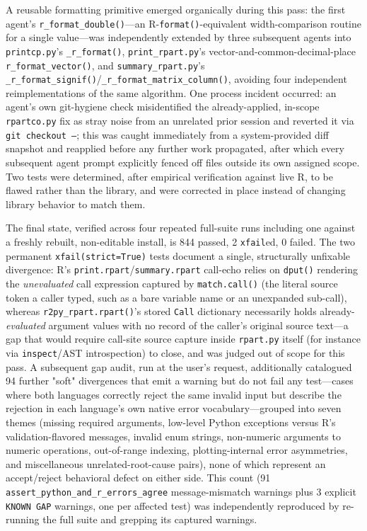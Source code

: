 \documentclass[12pt]{article}
\begin{document}
A reusable formatting primitive emerged organically during this pass: the first agent's \texttt{r\_format\_double()}---an R-\texttt{format()}-equivalent width-comparison routine for a single value---was independently extended by three subsequent agents into \texttt{printcp.py}'s \texttt{\_r\_format()}, \texttt{print\_rpart.py}'s vector-and-common-decimal-place \texttt{r\_format\_vector()}, and \texttt{summary\_rpart.py}'s \texttt{\_r\_format\_signif()}/\texttt{\_r\_format\_matrix\_column()}, avoiding four independent reimplementations of the same algorithm. One process incident occurred: an agent's own git-hygiene check misidentified the already-applied, in-scope \texttt{rpartco.py} fix as stray noise from an unrelated prior session and reverted it via \texttt{git checkout --}; this was caught immediately from a system-provided diff snapshot and reapplied before any further work propagated, after which every subsequent agent prompt explicitly fenced off files outside its own assigned scope. Two tests were determined, after empirical verification against live R, to be flawed rather than the library, and were corrected in place instead of changing library behavior to match them.

The final state, verified across four repeated full-suite runs including one against a freshly rebuilt, non-editable install, is 844 passed, 2 \texttt{xfail}ed, 0 failed. The two permanent \texttt{xfail(strict=True)} tests document a single, structurally unfixable divergence: R's \texttt{print.rpart}/\texttt{summary.rpart} call-echo relies on \texttt{dput()} rendering the \emph{unevaluated} call expression captured by \texttt{match.call()} (the literal source token a caller typed, such as a bare variable name or an unexpanded sub-call), whereas \texttt{r2py\_rpart.rpart()}'s stored \texttt{Call} dictionary necessarily holds already-\emph{evaluated} argument values with no record of the caller's original source text---a gap that would require call-site source capture inside \texttt{rpart.py} itself (for instance via \texttt{inspect}/AST introspection) to close, and was judged out of scope for this pass. A subsequent gap audit, run at the user's request, additionally catalogued 94 further "soft" divergences that emit a warning but do not fail any test---cases where both languages correctly reject the same invalid input but describe the rejection in each language's own native error vocabulary---grouped into seven themes (missing required arguments, low-level Python exceptions versus R's validation-flavored messages, invalid enum strings, non-numeric arguments to numeric operations, out-of-range indexing, plotting-internal error asymmetries, and miscellaneous unrelated-root-cause pairs), none of which represent an accept/reject behavioral defect on either side. This count (91 \texttt{assert\_python\_and\_r\_errors\_agree} message-mismatch warnings plus 3 explicit \texttt{KNOWN GAP} warnings, one per affected test) was independently reproduced by re-running the full suite and grepping its captured warnings.
\end{document}
